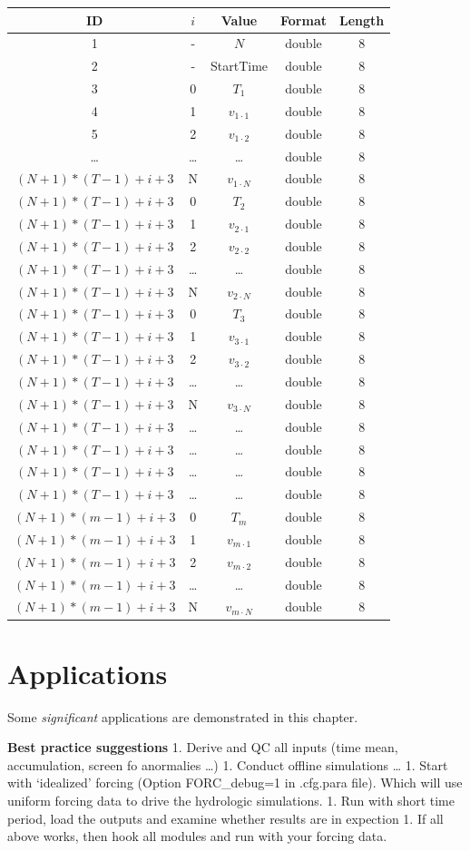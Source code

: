 \documentclass[]{scrbook}
\begin{document}
\begin{longtable}[]{@{}ccccc@{}}
\toprule
ID & \(i\) & Value & Format & Length\tabularnewline
\midrule
\endhead
1 & - & \(N\) & double & 8\tabularnewline
2 & - & StartTime & double & 8\tabularnewline
3 & 0 & \(T_1\) & double & 8\tabularnewline
4 & 1 & \(v_{1 \cdot 1}\) & double & 8\tabularnewline
5 & 2 & \(v_{1 \cdot 2}\) & double & 8\tabularnewline
\ldots{} & \ldots{} & \ldots{} & double & 8\tabularnewline
\((N+1) * (T-1) + i +3\) & N & \(v_{1 \cdot N}\) & double &
8\tabularnewline
\((N+1) * (T-1) + i +3\) & 0 & \(T_2\) & double & 8\tabularnewline
\((N+1) * (T-1) + i +3\) & 1 & \(v_{2 \cdot 1}\) & double &
8\tabularnewline
\((N+1) * (T-1) + i +3\) & 2 & \(v_{2 \cdot 2}\) & double &
8\tabularnewline
\((N+1) * (T-1) + i +3\) & \ldots{} & \ldots{} & double &
8\tabularnewline
\((N+1) * (T-1) + i +3\) & N & \(v_{2 \cdot N}\) & double &
8\tabularnewline
\((N+1) * (T-1) + i +3\) & 0 & \(T_3\) & double & 8\tabularnewline
\((N+1) * (T-1) + i +3\) & 1 & \(v_{3 \cdot 1}\) & double &
8\tabularnewline
\((N+1) * (T-1) + i +3\) & 2 & \(v_{3 \cdot 2}\) & double &
8\tabularnewline
\((N+1) * (T-1) + i +3\) & \ldots{} & \ldots{} & double &
8\tabularnewline
\((N+1) * (T-1) + i +3\) & N & \(v_{3 \cdot N}\) & double &
8\tabularnewline
\((N+1) * (T-1) + i +3\) & \ldots{} & \ldots{} & double &
8\tabularnewline
\((N+1) * (T-1) + i +3\) & \ldots{} & \ldots{} & double &
8\tabularnewline
\((N+1) * (T-1) + i +3\) & \ldots{} & \ldots{} & double &
8\tabularnewline
\((N+1) * (T-1) + i +3\) & \ldots{} & \ldots{} & double &
8\tabularnewline
\((N+1) * (m-1) + i +3\) & 0 & \(T_{m}\) & double & 8\tabularnewline
\((N+1) * (m-1) + i +3\) & 1 & \(v_{m \cdot 1}\) & double &
8\tabularnewline
\((N+1) * (m-1) + i +3\) & 2 & \(v_{m \cdot 2}\) & double &
8\tabularnewline
\((N+1) * (m-1) + i +3\) & \ldots{} & \ldots{} & double &
8\tabularnewline
\((N+1) * (m-1) + i +3\) & N & \(v_{m \cdot N}\) & double &
8\tabularnewline
\bottomrule
\end{longtable}

\chapter{Applications}\label{applications}

Some \emph{significant} applications are demonstrated in this chapter.

\textbf{Best practice suggestions} 1. Derive and QC all inputs (time
mean, accumulation, screen fo anormalies \ldots{}) 1. Conduct offline
simulations \ldots{} 1. Start with `idealized' forcing (Option
FORC\_debug=1 in .cfg.para file). Which will use uniform forcing data to
drive the hydrologic simulations. 1. Run with short time period, load
the outputs and examine whether results are in expection 1. If all above
works, then hook all modules and run with your forcing data.
\end{document}

